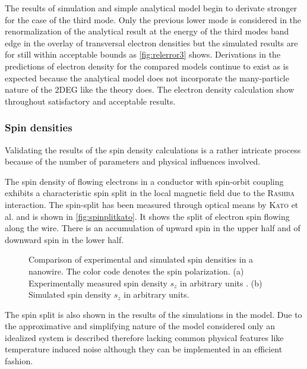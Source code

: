 The results of simulation and simple analytical model begin to derivate stronger for the case of the third mode. Only the previous lower mode is considered in the renormalization of the analytical result at the energy of the third modes band edge in the overlay of transversal electron densities but the simulated results are for still within acceptable bounds as \cref{fig:relerror3} shows. Derivations in the predictions of electron density for the compared models continue to exist as is expected because the analytical model does not incorporate the many-particle nature of the 2DEG like the \gfnc{} theory does.
The electron density calculation show throughout satisfactory and acceptable results.\par
\FloatBarrier
\subsubsection{Spin densities}
Validating the results of the spin density calculations is a rather intricate process because of the number of parameters and physical influences involved.\par
The spin density of flowing electrons in a conductor with spin-orbit coupling exhibits a characteristic spin split in the local magnetic field due to the \textsc{Rashba} interaction. The spin-split has been measured through optical means by \textsc{Kato} et al. \cite{Kato2004Science} and is shown in \cref{fig:spinplitkato}. It shows the split of electron spin flowing along the wire. There is an accumulation of upward spin in the upper half and of downward spin in the lower half.
\begin{figure}[h]
  \begin{center}
    \qquad
    \qquad
    \caption{Comparison of experimental and simulated spin densities in a nanowire. The color code denotes the spin polarization. (a) Experimentally measured spin density $s_z$ in arbitrary units \cite{Kato2004Science}. (b) Simulated spin density $s_z$ in arbitrary units.}
  \end{center}
\end{figure}
The spin split is also shown in the results of the simulations in the \gfnc{} model. Due to the approximative and simplifying nature of the model considered only an idealized system is described therefore lacking common physical features like temperature induced noise although they can be implemented in an efficient fashion.\par
\FloatBarrier
